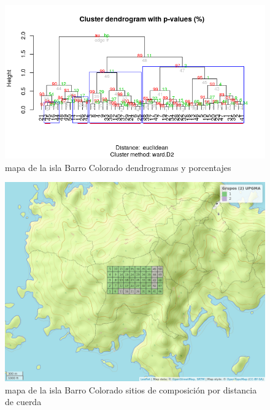 \documentclass[11pt,]{article}
\begin{document}
\begin{figure}
\centering
\includegraphics[width=1.00000\textwidth]{agrupamiento_dendrogramas_porcentajes.png}
\caption{mapa de la isla Barro Colorado dendrogramas y porcentajes
\label{fig:bci_map}}
\end{figure}

\begin{figure}
\centering
\includegraphics[width=1.00000\textwidth]{mapa_upgma_k2.png}
\caption{mapa de la isla Barro Colorado sitios de composición por
distancia de cuerda \label{fig:bci_map}}
\end{figure}
\end{document}
